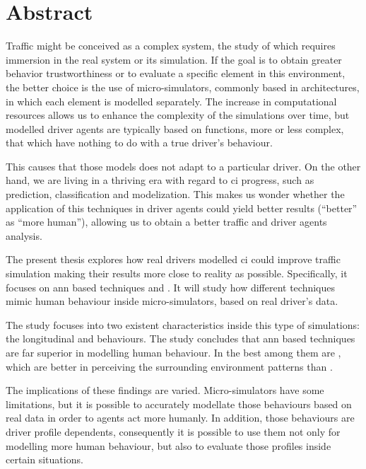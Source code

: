 \cleardoublepage
\thispagestyle{empty}
\chapter*{Abstract}
\begin{fullwidth}
	Traffic might be conceived as a complex system, the study of which requires immersion in the real system or its simulation. If the goal is to obtain greater behavior trustworthiness or to evaluate a specific element in this environment, the better choice is the use of micro-simulators, commonly based in  architectures, in which each element is modelled separately. The increase in computational resources allows us to enhance the complexity of the simulations over time, but modelled driver agents are typically based on functions, more or less complex, that which have nothing to do with a true driver’s behaviour. 
	
	This causes that those models does not adapt to a particular driver. On the other hand, we are living in a thriving era with regard to \Acrlong{ci} progress, such as prediction, classification and modelization. This makes us wonder whether the application of this techniques in driver agents could yield better results (\enquote{better} as \enquote{more human}), allowing us to obtain a better traffic and driver agents analysis.
	
	The present thesis explores how real drivers modelled \acrlong{ci} could improve traffic simulation making their results more close to reality as possible. Specifically, it focuses on \Acrlong{ann} based techniques and . It will study how different techniques mimic human behaviour inside micro-simulators, based on real driver’s data.
	
	The study focuses into two existent characteristics inside this type of simulations: the longitudinal and  behaviours. The study concludes that \acrlong{ann} based techniques are far superior in modelling human behaviour. In  the best among them are , which are better in perceiving the surrounding environment patterns than .
	
	The implications of these findings are varied. Micro-simulators have some limitations, but it is possible to accurately modellate those behaviours based on real data in order to agents act more humanly. In addition, those behaviours are driver profile dependents, consequently it is possible to use them not only for modelling more human behaviour, but also to evaluate those profiles inside certain situations.
\end{fullwidth}